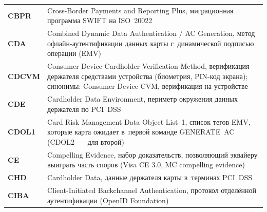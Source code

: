 \begin{longtable}{@{}p{4.5em}p{\dimexpr\linewidth-4.5em-2\tabcolsep\relax}@{}}
  \textbf{CBPR}              & Cross-Border Payments and Reporting Plus, миграционная программа SWIFT на ISO~20022                                                                                                                                                                                                              \\
  \textbf{CDA}               & Combined Dynamic Data Authentication / AC Generation, метод офлайн-аутентификации данных карты с~динамической подписью операции (EMV)                                                                                                                                                                                    \\
  \textbf{CDCVM}             & Consumer Device Cardholder Verification Method, верификация держателя средствами устройства (биометрия, PIN-код экрана); синонимы: Consumer Device CVM, верификация на устройстве                                                                                                                 \\
  \textbf{CDE}               & Cardholder Data Environment, периметр окружения данных держателя по PCI~DSS                                                                                                                                                                                                                      \\
  \textbf{CDOL1}             & Card Risk Management Data Object List~1, список тегов EMV, которые карта ожидает в~первой команде GENERATE~AC (CDOL2~--- для второй)                                                                                                                                                            \\
  \textbf{CE}                & Compelling Evidence, набор доказательств, позволяющий эквайеру выиграть часть споров (Visa CE 3.0, MC compelling evidence)                                                                                                                                                                         \\
  \textbf{CHD}               & Cardholder Data, данные держателя карты в~терминах PCI~DSS                                                                                                                                                                                                                                       \\
  \textbf{CIBA}              & Client-Initiated Backchannel Authentication, протокол отделённой аутентификации (OpenID Foundation)                                                                                                                                                                                              \\

\end{longtable}
